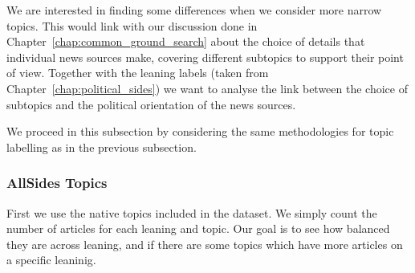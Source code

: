 We are interested in finding some differences when we consider more narrow topics. This would link with our discussion done in Chapter~\ref{chap:common_ground_search} about the choice of details that individual news sources make, covering different subtopics to support their point of view.
Together with the leaning labels (taken from Chapter~\ref{chap:political_sides}) we want to analyse the link between the choice of subtopics and the political orientation of the news sources.




We proceed in this subsection by considering the same methodologies for topic labelling as in the previous subsection.

\subsubsection{\statusgreen AllSides Topics}

First we use the native topics included in the dataset. We simply count the number of articles for each leaning and topic. Our goal is to see how balanced they are across leaning, and if there are some topics which have more articles on a specific leaninig.


